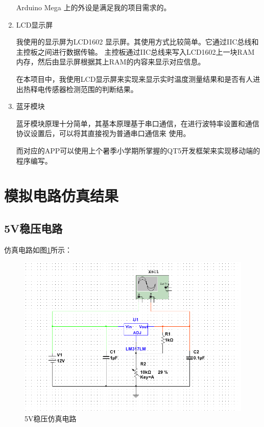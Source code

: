 \documentclass{article}
\begin{document}
\begin{spacing}{1.5}
\begin{enumerate}
        Arduino Mega 上的外设是满足我的项目需求的。

        \item LCD显示屏

        我使用的显示屏为LCD1602 显示屏。其使用方式比较简单。它通过IIC总线和主控板之间进行数据传输。
        主控板通过IIC总线来写入LCD1602上一块RAM内存，然后由显示屏根据其上RAM的内容来显示对应信息。 
      
        在本项目中，我使用LCD显示屏来实现来显示实时温度测量结果和是否有人进出热释电传感器检测范围的判断结果。

        \item 蓝牙模块

        蓝牙模块原理十分简单，其基本原理基于串口通信，在进行波特率设置和通信协议设置后，可以将其直接视为普通串口通信来
        使用。

        而对应的APP可以使用上个暑季小学期所掌握的QT5开发框架来实现移动端的程序编写。

    \end{enumerate}

\section{模拟电路仿真结果}

    \subsection{5V稳压电路}

    仿真电路如图\ref{fig:sim1}所示：
    \begin{figure}[H]
        \centering
        \includegraphics[scale=0.4]{fig/sim/sim1.png}
        \caption{5V稳压仿真电路}
        \label{fig:sim1}
    \end{figure}
    

\end{spacing}
\end{document}
